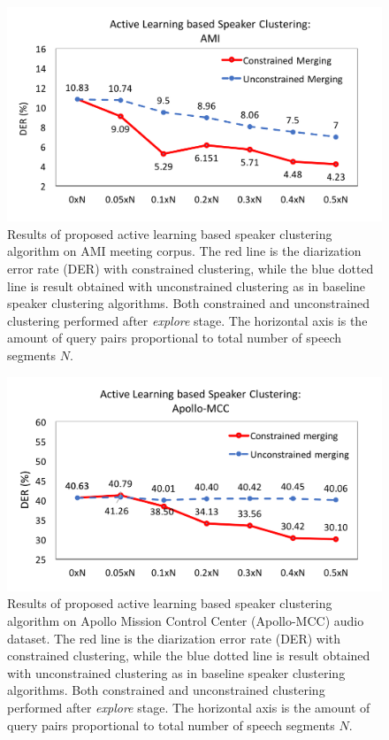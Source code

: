 \documentclass[journal]{IEEEtran}
\begin{document}
\begin{figure}[t]
	\centering
	\includegraphics[width=\linewidth]{figs/exp1_1}
	\caption{Results of proposed active learning based speaker clustering algorithm on AMI meeting corpus. The red line is the diarization error rate (DER) with constrained clustering, while the blue dotted line is result obtained with unconstrained clustering as in baseline speaker clustering algorithms. Both constrained and unconstrained clustering performed after \textit{explore} stage. The horizontal axis is the amount of query pairs proportional to total number of speech segments $N$. }
	\label{exp1_1}
\end{figure}
\begin{figure}[t]
	\includegraphics[width=\linewidth]{figs/exp1_2}
	\caption{Results of proposed active learning based speaker clustering algorithm on Apollo Mission Control Center (Apollo-MCC) audio dataset. The red line is the diarization error rate (DER) with constrained clustering, while the blue dotted line is result obtained with unconstrained clustering as in baseline speaker clustering algorithms. Both constrained and unconstrained clustering performed after \textit{explore} stage. The horizontal axis is the amount of query pairs proportional to total number of speech segments $N$.}
	\label{exp1_2}
\end{figure}
\end{document}
